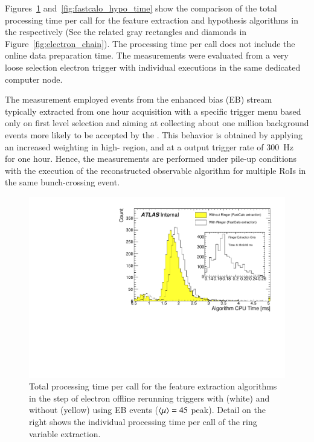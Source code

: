 Figures~\ref{fig:fastcalo_fex_time} and~\ref{fig:fastcalo_hypo_time} show the comparison of the total processing time per call for the feature extraction and hypothesis algorithms in the \fastcalo respectively (See the related \fastcalo gray rectangles and diamonds in Figure~\ref{fig:electron_chain}). The processing time per call does not include the online data preparation time. The measurements were evaluated from a very loose selection electron trigger with individual executions in the same dedicated computer node.


The measurement employed events from the enhanced bias (EB)
stream~\cite{eb_description} typically extracted from one hour acquisition with
a specific trigger menu based only on first level selection and aiming at
collecting about one million background events more likely to be accepted by the
\hlt{}. This behavior is obtained by applying an increased weighting in high-\pt{} region,
and at a output trigger rate of \SI{300}{\hertz}~\cite{eb_specifications} for one hour. Hence, the measurements are performed under pile-up conditions with the execution of the
reconstructed observable algorithm for multiple RoIs in the same bunch-crossing event.


\begin{figure}[h!tb]
	\includegraphics[width=.7\textwidth]{sections/03_operation/figures/EgammaFex_TotalTime}
	\centering
	\caption{\label{fig:fastcalo_fex_time}
		Total processing time per call for the feature extraction algorithms in the \fastcalo step of electron offline rerunning triggers with (white) and without (yellow) \rnn{} using EB events ($\langle \mu \rangle=45$ peak). Detail on the right shows the individual processing time per call of the ring variable extraction.  
	}
\end{figure}

